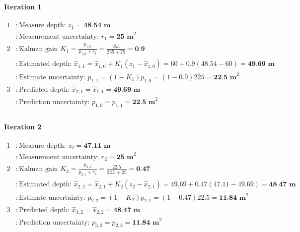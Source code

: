 \begin{fitbox}[frametitle=Example]
    \paragraph*{Iteration 1}
    \begin{equation*}
        \begin{aligned}
            1 &: \text{Measure depth: } z_1 = \textbf{48.54 m} \\
                &: \text{Measurement uncertainty: } r_1 = \textbf{25 m}^2 \\
            2 &: \text{Kalman gain } K_1 = \frac{p_{1,0}}{p_{1,0}+r_1} = \frac{255}{255 + 25} = \textbf{0.9} \\
                &: \text{Estimated depth: } \hat{x}_{1,1} = \hat{x}_{1,0} + K_1(z_1 - \hat{x}_{1,0}) = 60 + 0.9(48.54-60) = \textbf{49.69 m} \\
                &: \text{Estimate uncertainty: } p_{1,1} = (1-K_1)p_{1,0} = (1-0.9)225 = \textbf{22.5 m}^2 \\
            3 &: \text{Predicted depth: } \hat{x}_{2,1} = \hat{x}_{1,1} = \textbf{49.69 m} \\
                &: \text{Prediction uncertainty: } p_{1,0} = p_{1,1} = \textbf{22.5 m}^2 \\
        \end{aligned}
    \end{equation*}

    \paragraph*{Iteration 2}
    \begin{equation*}
        \begin{aligned}
            1 &: \text{Measure depth: } z_2 = \textbf{47.11 m} \\
                &: \text{Measurement uncertainty: } r_2 = \textbf{25 m}^2 \\
            2 &: \text{Kalman gain } K_2 = \frac{p_{2,1}}{p_{2,1}+r_2} = \frac{22.5}{22.5 + 25} = \textbf{0.47} \\
                &: \text{Estimated depth: } \hat{x}_{2,2} = \hat{x}_{2,1} + K_2(z_2 - \hat{x}_{2,1}) = 49.69 + 0.47(47.11-49.69) = \textbf{48.47 m} \\
                &: \text{Estimate uncertainty: } p_{2,2} = (1-K_2)p_{2,1} = (1-0.47)22.5 = \textbf{11.84 m}^2 \\
            3 &: \text{Predicted depth: } \hat{x}_{3,2} = \hat{x}_{2,2} = \textbf{48.47 m} \\
                &: \text{Prediction uncertainty: } p_{3,2} = p_{2,2} = \textbf{11.84 m}^2 \\
        \end{aligned}
    \end{equation*}


\end{fitbox}
